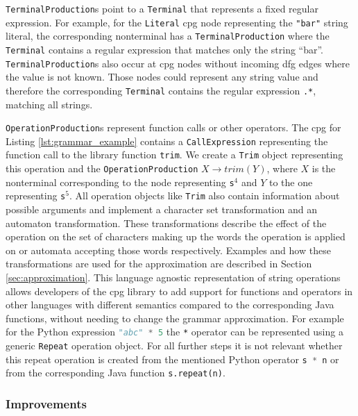 \lstinline|TerminalProduction|s point to a \lstinline|Terminal| that represents a fixed regular expression.
For example, for the \lstinline|Literal| \ac{cpg} node representing the \lstinline|"bar"| string literal, the corresponding nonterminal has a \lstinline|TerminalProduction| where the \lstinline|Terminal| contains a regular expression that matches only the string \enquote{bar}. \lstinline|TerminalProduction|s also occur at \ac{cpg} nodes without incoming \ac{dfg} edges where the value is not known. Those nodes could represent any string value and therefore the corresponding \lstinline|Terminal| contains the regular expression \lstinline|.*|, matching all strings.

\lstinline|OperationProduction|s represent function calls or other operators. The \ac{cpg} for Listing \ref{lst:grammar_example} contains a \lstinline|CallExpression| representing the function call to the library function \lstinline|trim|. We create a \lstinline|Trim| object representing this operation and the \lstinline|OperationProduction| $X \rightarrow trim(Y)$, where $X$ is the nonterminal corresponding to the node representing \lstinline|s|$^4$ and $Y$ to the one representing \lstinline|s|$^5$. 
All operation objects like \lstinline|Trim| also contain information about possible arguments and implement a character set transformation and an automaton transformation. These transformations describe the effect of the operation on the set of characters making up the words the operation is applied on or automata accepting those words respectively.
Examples and how these transformations are used for the approximation are described in Section \ref{sec:approximation}.
This language agnostic representation of string operations allows developers of the \ac{cpg} library to add support for functions and operators in other languages with different semantics compared to the corresponding Java functions, without needing to change the grammar approximation. For example for the Python expression \lstinline[language=Python]|"abc" * 5| the \lstinline|*| operator can be represented using a generic \lstinline|Repeat| operation object. For all further steps it is not relevant whether this repeat operation is created from the mentioned Python operator \lstinline[language=Python]|s * n| or from the corresponding Java function \lstinline|s.repeat(n)|. 


\subsubsection{Improvements}

